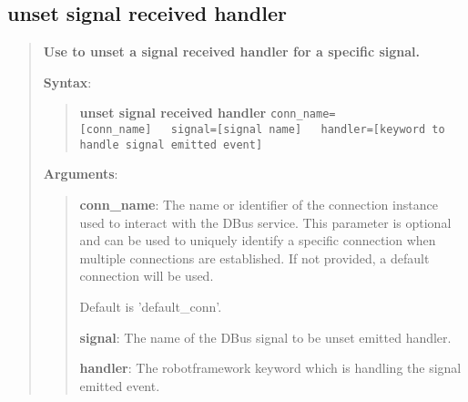 \hypertarget{description-unset-signal-received-handler}{%
\subsection{\texorpdfstring{\textbf{unset signal received handler}}{unset signal received handler}}\label{description-unset-signal-received-handler}}

\begin{quote}
\textbf{Use to unset a signal received handler for a specific signal.}

\textbf{Syntax}:
\begin{quote}
\textbf{unset signal received handler}
\texttt{conn\_name={[}conn\_name{]}\ \ \ signal={[}signal name{]}\ \ \ handler={[}keyword to handle signal emitted event{]}}
\end{quote}

\textbf{Arguments}:

\begin{quote}
\textbf{conn\_name}: The name or identifier of the connection instance used to interact with the DBus service.
  This parameter is optional and can be used to uniquely identify a specific connection
  when multiple connections are established. If not provided, a default connection will be used.

  Default is 'default\_conn'.

\vspace{\baselineskip}

\textbf{signal}: The name of the DBus signal to be unset emitted handler.

\vspace{\baselineskip}

\textbf{handler}:  The robotframework keyword which is handling the signal emitted event.
\end{quote}
\end{quote}

